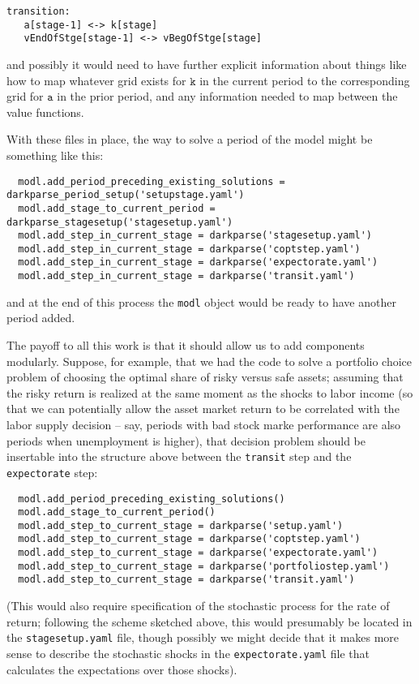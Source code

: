 \documentclass[SolvingMicroDSOPs]{subfiles}
\begin{document}
\begin{verbatim}
transition:
   a[stage-1] <-> k[stage]
   vEndOfStge[stage-1] <-> vBegOfStge[stage]
\end{verbatim}
and possibly it would need to have further explicit information about things like how to map whatever grid exists for $\texttt{k}$ in the current period to the corresponding grid for $\texttt{a}$ in the prior period, and any information needed to map between the value functions.

With these files in place, the way to solve a period of the model might be something like this:
\begin{verbatim}
  modl.add_period_preceding_existing_solutions = darkparse_period_setup('setupstage.yaml')
  modl.add_stage_to_current_period = darkparse_stagesetup('stagesetup.yaml')
  modl.add_step_in_current_stage = darkparse('stagesetup.yaml')
  modl.add_step_in_current_stage = darkparse('coptstep.yaml')
  modl.add_step_in_current_stage = darkparse('expectorate.yaml')
  modl.add_step_in_current_stage = darkparse('transit.yaml')
\end{verbatim}
and at the end of this process the \texttt{modl} object would be ready to have another period added.

The payoff to all this work is that it should allow us to add components modularly.  Suppose, for example, that we had the code to solve a portfolio choice problem of choosing the optimal share of risky versus safe assets; assuming that the risky return is realized at the same moment as the shocks to labor income (so that we can potentially allow the asset market return to be correlated with the labor supply decision -- say, periods with bad stock marke performance are also periods when unemployment is higher), that decision problem should be insertable into the structure above between the \texttt{transit} step and the \texttt{expectorate} step:
\begin{verbatim}
  modl.add_period_preceding_existing_solutions()
  modl.add_stage_to_current_period()
  modl.add_step_to_current_stage = darkparse('setup.yaml')
  modl.add_step_to_current_stage = darkparse('coptstep.yaml')
  modl.add_step_to_current_stage = darkparse('expectorate.yaml')
  modl.add_step_to_current_stage = darkparse('portfoliostep.yaml')
  modl.add_step_to_current_stage = darkparse('transit.yaml')
\end{verbatim}

(This would also require specification of the stochastic process for the rate of return; following the scheme sketched above, this would presumably be located in the \texttt{stagesetup.yaml} file, though possibly we might decide that it makes more sense to describe the stochastic shocks in the \texttt{expectorate.yaml} file that calculates the expectations over those shocks).
\end{document}
